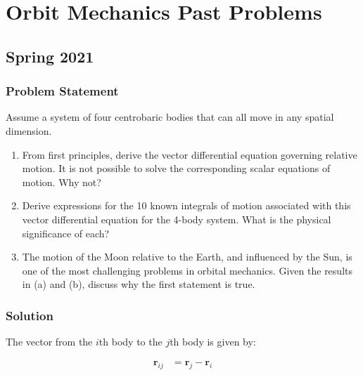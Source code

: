 \newcommand{\v}[1]{\mathbf{#1}}
\newcommand{\dv}[1]{\dot{\v{#1}}}
\newcommand{\ddv}[1]{\ddot{\v{#1}}}
\newcommand{\uv}[1]{\hat{\v{#1}}}



\maketitle

\section{Orbit Mechanics Past Problems}

\subsection{Spring 2021}

\subsubsection{Problem Statement}

Assume a system of four centrobaric bodies that can all move in any spatial dimension.

\begin{enumerate}
    \item From first principles, derive the vector differential equation governing relative motion. It is not possible to solve the corresponding scalar equations of motion. Why not?
    \item Derive expressions for the 10 known integrals of motion associated with this vector differential equation for the 4-body system. What is the physical significance of each?
    \item The motion of the Moon relative to the Earth, and influenced by the Sun, is one of the most challenging problems in orbital mechanics. Given the results in (a) and (b), discuss why the first statement is true.
\end{enumerate}

\subsubsection{Solution}

The vector from the $i$th body to the $j$th body is given by:

\begin{align*}
    \v{r}_{ij} &= \v{r}_j - \v{r}_i \\
\end{align*}

